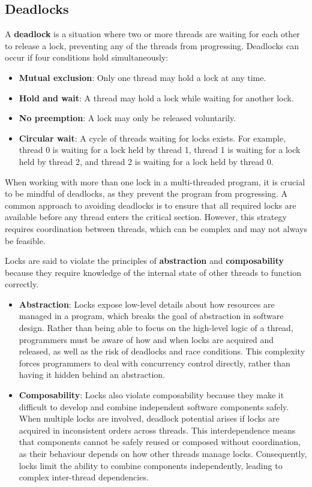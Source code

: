 \documentclass{article}
\begin{document}
\subsection{Deadlocks}
A \textbf{deadlock} is a situation where two or more threads are
waiting for each other to release a lock, preventing any of the threads
from progressing. Deadlocks can occur if four conditions hold
simultaneously:
\begin{itemize}
    \item \textbf{Mutual exclusion}: Only one thread may hold a lock at
          any time.
    \item \textbf{Hold and wait}: A thread may hold a lock while waiting
          for another lock.
    \item \textbf{No preemption}: A lock may only be released voluntarily.
    \item \textbf{Circular wait}: A cycle of threads waiting for locks
          exists. For example, thread 0 is waiting for a lock held by
          thread 1, thread 1 is waiting for a lock held by thread 2, and
          thread 2 is waiting for a lock held by thread 0.
\end{itemize}
When working with more than one lock in a multi-threaded program, it is
crucial to be mindful of deadlocks, as they prevent the program from
progressing. A common approach to avoiding deadlocks is to ensure that
all required locks are available before any thread enters the critical
section. However, this strategy requires coordination between threads,
which can be complex and may not always be feasible.

Locks are said to violate the principles of \textbf{abstraction} and
\textbf{composability} because they require knowledge of the internal
state of other threads to function correctly.
\begin{itemize}
    \item \textbf{Abstraction}: Locks expose low-level details about how
          resources are managed in a program, which breaks the goal of
          abstraction in software design. Rather than being able to
          focus on the high-level logic of a thread, programmers must be
          aware of how and when locks are acquired and released, as well
          as the risk of deadlocks and race conditions. This complexity
          forces programmers to deal with concurrency control directly,
          rather than having it hidden behind an abstraction.
    \item \textbf{Composability}: Locks also violate composability
          because they make it difficult to develop and combine
          independent software components safely. When multiple locks
          are involved, deadlock potential arises if locks are acquired
          in inconsistent orders across threads. This interdependence
          means that components cannot be safely reused or composed
          without \linebreak coordination, as their behaviour depends on how other
          threads manage locks. Consequently, locks limit the ability to
          combine components independently, leading to complex inter-thread
          dependencies.
\end{itemize}
\end{document}
